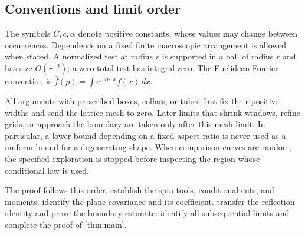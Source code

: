 \subsection{Conventions and limit order}

The symbols $C,c,\alpha$ denote positive constants, whose values may change
between occurrences.  Dependence on a fixed finite macroscopic arrangement
is allowed when stated.  A normalized test at radius $r$ is supported in a
ball of radius $r$ and has size $O(r^{-2})$; a zero-total test has integral
zero.  The Euclidean Fourier convention is
$\widehat f(p)=\int e^{-ip\cdot x}f(x)\,dx$.

All arguments with prescribed boxes, collars, or tubes first fix their
positive widths and send the lattice mesh to zero.  Later limits that
shrink windows, refine grids, or approach the boundary are taken only
after this mesh limit.  In particular, a lower bound depending on a fixed
aspect ratio is never used as a uniform bound for a degenerating shape.
When comparison curves are random, the specified exploration is stopped
before inspecting the region whose conditional law is used.

The proof follows this order.   establish
the spin tools, conditional cuts, and moments.  
identify the plane covariance and its coefficient.  
transfer the reflection identity and prove the boundary estimate.
 identify all subsequential limits and complete
the proof of \cref{thm:main}.
